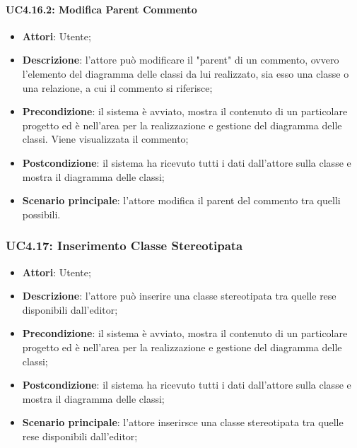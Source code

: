\paragraph{UC4.16.2: Modifica Parent Commento}
\label{UC4.16.2}
\begin{itemize}
	\item \textbf{Attori}: Utente;
	\item \textbf{Descrizione}: l'attore può modificare il "parent" di un commento, ovvero l'elemento del diagramma delle classi da lui realizzato, sia esso una classe o una relazione, a cui il commento si riferisce;
	\item \textbf{Precondizione}: il sistema è avviato, mostra il contenuto di un particolare progetto ed è nell'area per la realizzazione e gestione del diagramma delle classi. Viene visualizzata il commento;
	\item \textbf{Postcondizione}: il sistema ha ricevuto tutti i dati dall'attore sulla classe e mostra il diagramma delle classi;
	\item \textbf{Scenario principale}: l'attore modifica il parent del commento tra quelli possibili.
\end{itemize}

\subsubsection{UC4.17: Inserimento Classe Stereotipata}
\label{UC4.17}
\begin{itemize}
	\item \textbf{Attori}: Utente;
	\item \textbf{Descrizione}: l'attore può inserire una classe stereotipata tra quelle rese disponibili dall'editor;
	\item \textbf{Precondizione}: il sistema è avviato, mostra il contenuto di un particolare progetto ed è nell'area per la realizzazione e gestione del diagramma delle classi;
	\item \textbf{Postcondizione}: il sistema ha ricevuto tutti i dati dall'attore sulla classe e mostra il diagramma delle classi;
	\item \textbf{Scenario principale}: l'attore inserirsce una classe stereotipata tra quelle rese disponibili dall'editor;
\end{itemize}

